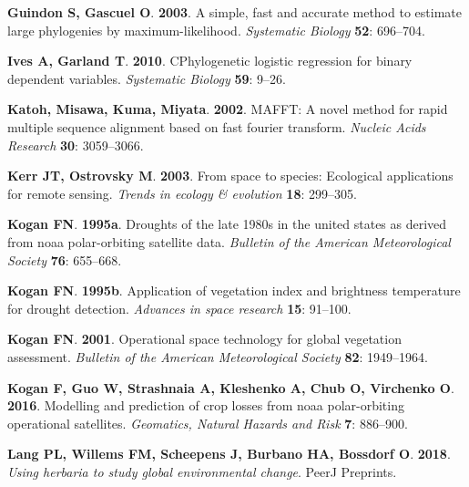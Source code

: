 \documentclass[man,floatsintext]{apa6}
\theoremstyle{definition}
\theoremstyle{definition}
\theoremstyle{definition}
\theoremstyle{remark}
\begin{document}
\leavevmode\hypertarget{ref-guindon2003a}{}%
\textbf{\textnormal{Guindon S}, \textnormal{Gascuel O}}. \textbf{2003}.
A simple, fast and accurate method to estimate large phylogenies by
maximum-likelihood. \emph{Systematic Biology} \textbf{52}: 696--704.

\leavevmode\hypertarget{ref-ives2010phylogenetic}{}%
\textbf{\textnormal{Ives A}, \textnormal{Garland T}}. \textbf{2010}.
CPhylogenetic logistic regression for binary dependent variables.
\emph{Systematic Biology} \textbf{59}: 9--26.

\leavevmode\hypertarget{ref-katoh2002mafft}{}%
\textbf{\textnormal{Katoh}, \textnormal{Misawa}, \textnormal{Kuma},
\textnormal{Miyata}}. \textbf{2002}. MAFFT: A novel method for rapid
multiple sequence alignment based on fast fourier transform.
\emph{Nucleic Acids Research} \textbf{30}: 3059--3066.

\leavevmode\hypertarget{ref-kerr2003space}{}%
\textbf{\textnormal{Kerr JT}, \textnormal{Ostrovsky M}}. \textbf{2003}.
From space to species: Ecological applications for remote sensing.
\emph{Trends in ecology \& evolution} \textbf{18}: 299--305.

\leavevmode\hypertarget{ref-kogan1995droughts}{}%
\textbf{\textnormal{Kogan FN}}. \textbf{1995a}. Droughts of the late
1980s in the united states as derived from noaa polar-orbiting satellite
data. \emph{Bulletin of the American Meteorological Society}
\textbf{76}: 655--668.

\leavevmode\hypertarget{ref-kogan1995application}{}%
\textbf{\textnormal{Kogan FN}}. \textbf{1995b}. Application of
vegetation index and brightness temperature for drought detection.
\emph{Advances in space research} \textbf{15}: 91--100.

\leavevmode\hypertarget{ref-kogan2001operational}{}%
\textbf{\textnormal{Kogan FN}}. \textbf{2001}. Operational space
technology for global vegetation assessment. \emph{Bulletin of the
American Meteorological Society} \textbf{82}: 1949--1964.

\leavevmode\hypertarget{ref-kogan2016modelling}{}%
\textbf{\textnormal{Kogan F}, \textnormal{Guo W}, \textnormal{Strashnaia
A}, \textnormal{Kleshenko A}, \textnormal{Chub O}, \textnormal{Virchenko
O}}. \textbf{2016}. Modelling and prediction of crop losses from noaa
polar-orbiting operational satellites. \emph{Geomatics, Natural Hazards
and Risk} \textbf{7}: 886--900.

\leavevmode\hypertarget{ref-lang2018using}{}%
\textbf{\textnormal{Lang PL}, \textnormal{Willems FM},
\textnormal{Scheepens J}, \textnormal{Burbano HA}, \textnormal{Bossdorf
O}}. \textbf{2018}. \emph{Using herbaria to study global environmental
change}. PeerJ Preprints.
\end{document}
